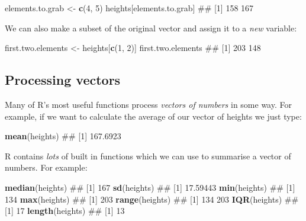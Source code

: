 \documentclass[]{article}
\newenvironment{Shaded}{\begin{snugshade}}{\end{snugshade}}
\newcommand{\KeywordTok}[1]{\textcolor[rgb]{0.13,0.29,0.53}{\textbf{#1}}}
\newcommand{\DecValTok}[1]{\textcolor[rgb]{0.00,0.00,0.81}{#1}}
\newcommand{\StringTok}[1]{\textcolor[rgb]{0.31,0.60,0.02}{#1}}
\newcommand{\NormalTok}[1]{#1}
\theoremstyle{definition}
\theoremstyle{definition}
\theoremstyle{definition}
\theoremstyle{remark}
\begin{document}
\begin{Shaded}
\begin{Highlighting}[]
\NormalTok{elements.to.grab <-}\StringTok{ }\KeywordTok{c}\NormalTok{(}\DecValTok{4}\NormalTok{, }\DecValTok{5}\NormalTok{)}
\NormalTok{heights[elements.to.grab]}
\NormalTok{## [1] 158 167}
\end{Highlighting}
\end{Shaded}

We can also make a subset of the original vector and assign it to a
\emph{new} variable:

\begin{Shaded}
\begin{Highlighting}[]
\NormalTok{first.two.elements <-}\StringTok{ }\NormalTok{heights[}\KeywordTok{c}\NormalTok{(}\DecValTok{1}\NormalTok{, }\DecValTok{2}\NormalTok{)]}
\NormalTok{first.two.elements}
\NormalTok{## [1] 203 148}
\end{Highlighting}
\end{Shaded}

\subsection*{Processing vectors}\label{processing-vectors}

Many of R's most useful functions process \emph{vectors of numbers} in
some way. For example, if we want to calculate the average of our vector
of heights we just type:

\begin{Shaded}
\begin{Highlighting}[]
\KeywordTok{mean}\NormalTok{(heights)}
\NormalTok{## [1] 167.6923}
\end{Highlighting}
\end{Shaded}

R contains \emph{lots} of built in functions which we can use to
summarise a vector of numbers. For example:

\begin{Shaded}
\begin{Highlighting}[]
\KeywordTok{median}\NormalTok{(heights)}
\NormalTok{## [1] 167}
\KeywordTok{sd}\NormalTok{(heights)}
\NormalTok{## [1] 17.59443}
\KeywordTok{min}\NormalTok{(heights)}
\NormalTok{## [1] 134}
\KeywordTok{max}\NormalTok{(heights)}
\NormalTok{## [1] 203}
\KeywordTok{range}\NormalTok{(heights)}
\NormalTok{## [1] 134 203}
\KeywordTok{IQR}\NormalTok{(heights)}
\NormalTok{## [1] 17}
\KeywordTok{length}\NormalTok{(heights)}
\NormalTok{## [1] 13}
\end{Highlighting}
\end{Shaded}
\end{document}
